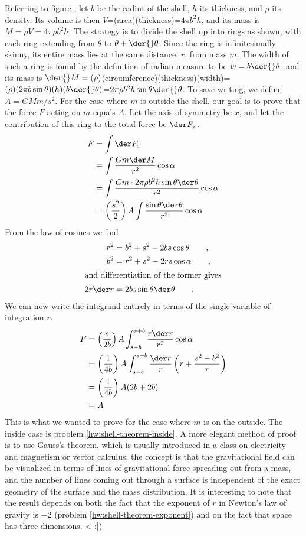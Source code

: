 Referring to figure , let $b$ be the radius of the shell, $h$ its thickness, and $\rho$
its density.
Its volume is then $V$=(area)(thickness)=$4\pi{}b^2h$, and
its mass is $M=\rho{}V=4\pi{}\rho{}b^2h$. The strategy is to divide the shell
up into rings as shown, with each ring
extending from $\theta$ to $\theta+\der{}\theta$. Since the ring is infinitesimally
skinny, its entire mass lies at the same distance, $r$, from mass $m$.
The width of such a ring is
found by the definition of radian measure to be $w=b\der{}\theta$, and its mass
is $\der{}M=(\rho)$(circumference)(thickness)(width)=
$(\rho)(2\pi{}b \sin{} \theta)(h)(b\der{}\theta)$=$2\pi\rho b^2h\sin{}\theta\der{}\theta$.
To save writing, we define $A=GMm/s^2$. For the case where $m$ is outside the shell, our goal is to prove that the force $F$ acting on
$m$ equals $A$. Let the axis of symmetry be $x$, and let the contribution of this ring to the total force be $\der F_x$.
\begin{align*}
  F &= \int \der F_x \\
    &= \int \frac{Gm \der M }{r^2}\cos\alpha \\
    &= \int \frac{Gm \cdot 2\pi\rho b^2h\sin\theta\der\theta}{r^2}\cos\alpha \\
    &= \left(\frac{s^2}{2}\right)A\int \frac{\sin\theta\der\theta}{r^2}\cos\alpha 
\end{align*}
From the law of cosines we find
\begin{align*}
  r^2 &= b^2 + s^2 - 2bs\cos\theta \qquad ,\\
  b^2 &= r^2 + s^2 -2rs\cos\alpha \qquad ,\\
\intertext{and differentiation of the former gives}  
  2r\der r & =        2bs\sin\theta\der\theta \qquad .
\end{align*}
We can now write the integrand entirely in terms of the single variable of integration $r$.
\begin{align*}
  F &= \left(\frac{s}{2b}\right)A \int_{s-b}^{s+b} \frac{r\der r}{r^2}\cos\alpha \\
    &= \left(\frac{1}{4b}\right)A \int_{s-b}^{s+b} \frac{\der r}{r}\left(r+\frac{s^2-b^2}{r}\right) \\
    &= \left(\frac{1}{4b}\right)A (2b+2b) \\
    &= A
\end{align*}
This is what we wanted to prove for the case where $m$ is on the outside. The inside case is problem
\ref{hw:shell-theorem-inside}. A more elegant method of proof is to use Gauss's theorem, which is usually
introduced in a class on electricity and magnetism or vector calculus; the concept is that the gravitational
field can be visualized in terms of lines of gravitational force spreading out from a mass, and the number
of lines coming out through a surface is independent of the exact geometry of the surface and the mass
distribution.
It is interesting to note that the result depends on both the fact that
the exponent of $r$ in Newton's law of gravity is $-2$ (problem \ref{hw:shell-theorem-exponent}) and on the fact that space has three dimensions.
<%
:])

